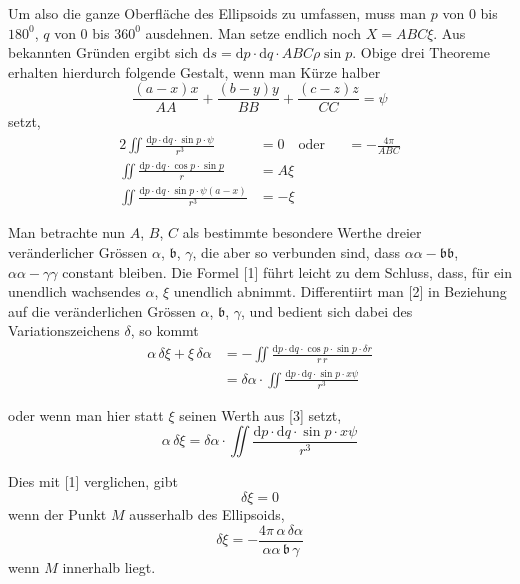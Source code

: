 \documentclass[11pt,a4paper]{article}
\begin{document}
Um also die ganze Oberfläche des Ellipsoids zu umfassen, muss man $p$ von $0$ bis $180^0$, $q$ von $0$ bis $360^0$ ausdehnen. Man setze endlich noch $X = ABC\xi$. Aus bekannten Gründen ergibt sich $\mathrm{d}s = \mathrm{d}p \cdot \mathrm{d}q \cdot ABC\rho \sin p$. Obige drei Theoreme erhalten hierdurch folgende Gestalt, wenn man Kürze halber
\[
\frac{(a-x)x}{AA} + \frac{(b-y)y}{BB} + \frac{(c-z)z}{CC} = \psi
\]
setzt,
\begin{alignat*}{2}
\tag{[1]} \iint\frac{\mathrm{d}p \cdot \mathrm{d}q \cdot \sin p \cdot \psi}{r^3} &= 0 \quad \text{oder} &&= -\frac{4\pi}{ABC} \\
\tag{[2]} \iint\frac{\mathrm{d}p \cdot \mathrm{d}q \cdot \cos p \cdot \sin p}{r} &= A\xi \\
\tag{[3]} \iint\frac{\mathrm{d}p \cdot \mathrm{d}q \cdot \sin p \cdot \psi(a-x)}{r^3} &= -\xi &&
\end{alignat*}

Man betrachte nun $A$, $B$, $C$ als bestimmte besondere Werthe dreier veränderlicher Grössen $\alpha$, $\mathfrak{b}$, $\gamma$, die aber so verbunden sind, dass $\alpha\alpha - \mathfrak{b}\mathfrak{b}$, $\alpha\alpha - \gamma\gamma$ constant bleiben. Die Formel [1] führt leicht zu dem Schluss, dass, für ein unendlich wachsendes $\alpha$, $\xi$ unendlich abnimmt. Differentiirt man [2] in Beziehung auf die veränderlichen Grössen $\alpha$, $\mathfrak{b}$, $\gamma$, und bedient sich dabei des Variationszeichens $\delta$, so kommt
\begin{align*}
\alpha\,\delta\xi + \xi\,\delta\alpha &= -\iint\frac{\mathrm{d}p \cdot \mathrm{d}q \cdot \cos p \cdot \sin p \cdot \delta r}{r\,r} \\
  &= \delta\alpha \cdot \iint\frac{\mathrm{d}p \cdot \mathrm{d}q \cdot \sin p \cdot x\psi}{r^3}
\end{align*}

\newpage
\noindent
oder wenn man hier statt $\xi$ seinen Werth aus [3] setzt,
\[
\alpha\,\delta\xi = \delta\alpha \cdot \iint\frac{\mathrm{d}p \cdot \mathrm{d}q \cdot \sin p \cdot x\psi}{r^3}
\]

Dies mit [1] verglichen, gibt
\[
\tag{[4]} \delta\xi = 0
\]
 wenn der Punkt $M$ ausserhalb des Ellipsoids,
\[
\tag{[5]} \delta\xi = -\frac{4\pi\,\alpha\,\delta\alpha}{\alpha\alpha\,\mathfrak{b}\,\gamma}
\]
wenn $M$ innerhalb liegt.
\end{document}
